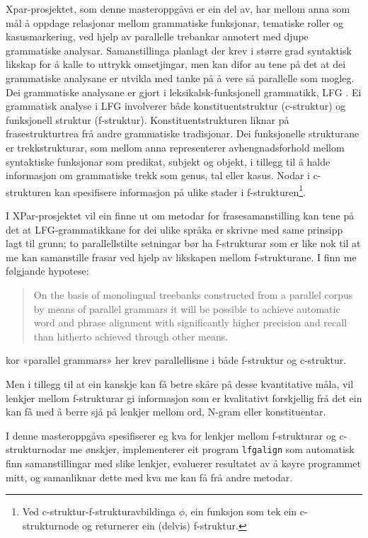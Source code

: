 \documentclass[11pt,a4paper,oneside,draft]{book}
\begin{document}
Xpar-prosjektet, som denne masteroppgåva er ein del av, har mellom
anna som mål å oppdage relasjonar mellom grammatiske funksjonar,
tematiske roller og kasusmarkering, ved hjelp av parallelle trebankar
annotert med djupe grammatiske analysar.  Samanstillinga planlagt der
krev i større grad syntaktisk likskap for å kalle to uttrykk
omsetjingar, men kan difor au tene på det at dei grammatiske analysane
er utvikla med tanke på å vere så parallelle som mogleg.  Dei
grammatiske analysane er gjort i leksikalsk-funksjonell grammatikk,
LFG \citep{bresnan2001lfs}. Ei grammatisk analyse i LFG involverer
både konstituentstruktur (c-struktur) og funksjonell struktur
(f-struktur). Konstituentstrukturen liknar på frasestrukturtrea frå
andre grammatiske tradisjonar. Dei funksjonelle strukturane er
trekkstrukturar, som mellom anna representerer avhengnadsforhold
mellom syntaktiske funksjonar som predikat, subjekt og objekt, i
tillegg til å halde informasjon om grammatiske trekk som genus, tal
eller kasus. Nodar i c-strukturen kan spesifisere informasjon på ulike
stader i f-strukturen\footnote{Ved c-struktur-f-strukturavbildinga $\phi$, ein funksjon som
        tek ein c-strukturnode og returnerer ein (delvis) f-struktur. }.

I XPar-prosjektet vil ein finne ut om metodar for frasesamanstilling
kan tene på det at LFG-grammatikkane for dei ulike språka er skrivne
med same prinsipp lagt til grunn; to parallellstilte setningar bør ha
f-strukturar som er like nok til at me kan samanstille frasar ved
hjelp av likskapen mellom f-strukturane. I \citet[s.~72]{dyvik2009lmp}
finn me følgjande hypotese:

\begin{quote}
On the basis of monolingual treebanks constructed from a parallel
corpus by means of parallel grammars it will be possible to achieve
automatic word and phrase alignment with significantly higher
precision and recall than hitherto achieved through other means.
\end{quote}

kor «parallel grammars» her krev parallellisme i både f-struktur og
c-struktur.

Men i tillegg til at ein kanskje kan få betre skåre på desse
kvantitative måla, vil lenkjer mellom f-strukturar gi informasjon som
er kvalitativt forskjellig frå det ein kan få med å berre sjå på
lenkjer mellom ord, N-gram eller konstituentar.

I denne masteroppgåva spesifiserer eg kva for lenkjer mellom
f-strukturar og c-strukturnodar me ønskjer, implementerer eit program
\texttt{lfgalign} som automatisk finn samanstillingar med slike lenkjer,
evaluerer resultatet av å køyre programmet mitt, og samanliknar dette
med kva me kan få frå andre metodar.
\end{document}
